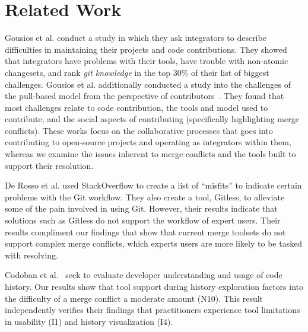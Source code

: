 \section{Related Work}\label{related_work}

Gousios et al. \cite{integrator_perspective} conduct a study in which they ask integrators to describe difficulties in maintaining their projects and code contributions. 
They showed that integrators have problems with their tools, have trouble with non-atomic changesets, and rank \textit{git knowledge} in the top 30\% of their list of biggest challenges. 
Gousios et al. additionally conducted a study into the challenges of the pull-based model from the perspective of contributors~\cite{gousios2016work}. 
They found that most challenges relate to code contribution, the tools and model used to contribute, and the social aspects of contributing (specifically highlighting merge conflicts).
These works focus on the collaborative processes that goes into contributing to open-source projects and operating as integrators within them, whereas we examine the issues inherent to merge conflicts and the tools built to support their resolution.

De Rosso et al. \cite{DeRosso2016} used StackOverflow to create a list of ``misfits'' to indicate certain problems with the Git workflow. 
They also create a tool, Gitless, to alleviate some of the pain involved in using Git.
However, their results indicate that solutions such as Gitless do not support the workflow of expert users.
Their results compliment our findings that show that current merge toolsets do not support complex merge conflicts, which experts users are more likely to be tasked with resolving.

Codoban et al.~\cite{Mihai_lenses} seek to evaluate developer understanding and usage of code history. Our results show that tool support during history exploration factors into the difficulty of a merge conflict a moderate amount (N10). This result independently verifies their findings that practitioners experience tool limitations in usability (I1) and history visualization (I4).